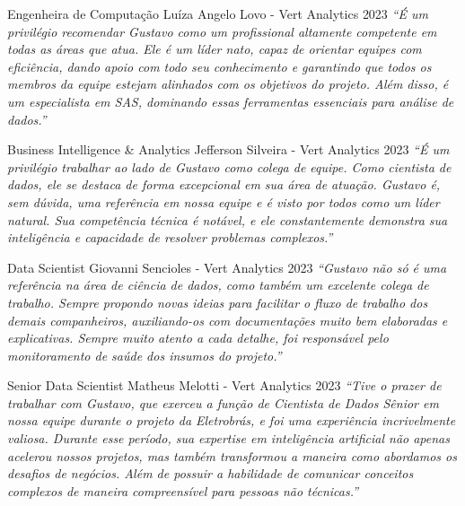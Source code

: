 \begin{cventries}
  \cventry
    {Engenheira de Computação} %
    {Luíza Angelo Lovo - Vert Analytics} %
    {2023} %
    {} %
    {
      \textit{``É um privilégio recomendar Gustavo como um profissional altamente competente em todas as áreas que atua. Ele é um líder nato, capaz de orientar equipes com eficiência, dando apoio com todo seu conhecimento e garantindo que todos os membros da equipe estejam alinhados com os objetivos do projeto. Além disso, é um especialista em SAS, dominando essas ferramentas essenciais para análise de dados.''}
    }

  \cventry
    {Business Intelligence \& Analytics} %
    {Jefferson Silveira - Vert Analytics} %
    {2023} %
    {} %
    {
      \textit{``É um privilégio trabalhar ao lado de Gustavo como colega de equipe. Como cientista de dados, ele se destaca de forma excepcional em sua área de atuação. Gustavo é, sem dúvida, uma referência em nossa equipe e é visto por todos como um líder natural. Sua competência técnica é notável, e ele constantemente demonstra sua inteligência e capacidade de resolver problemas complexos.''}
    }

  \cventry
    {Data Scientist} %
    {Giovanni Sencioles - Vert Analytics} %
    {2023} %
    {} %
    {
      \textit{``Gustavo não só é uma referência na área de ciência de dados, como também um excelente colega de trabalho. Sempre propondo novas ideias para facilitar o fluxo de trabalho dos demais companheiros, auxiliando-os com documentações muito bem elaboradas e explicativas. Sempre muito atento a cada detalhe, foi responsável pelo monitoramento de saúde dos insumos do projeto.''}
    }

  \cventry
    {Senior Data Scientist} %
    {Matheus Melotti - Vert Analytics} %
    {2023} %
    {} %
    {
      \textit{``Tive o prazer de trabalhar com Gustavo, que exerceu a função de Cientista de Dados Sênior em nossa equipe durante o projeto da Eletrobrás, e foi uma experiência incrivelmente valiosa. Durante esse período, sua expertise em inteligência artificial não apenas acelerou nossos projetos, mas também transformou a maneira como abordamos os desafios de negócios. Além de possuir a habilidade de comunicar conceitos complexos de maneira compreensível para pessoas não técnicas.''}
    }

\end{cventries} 